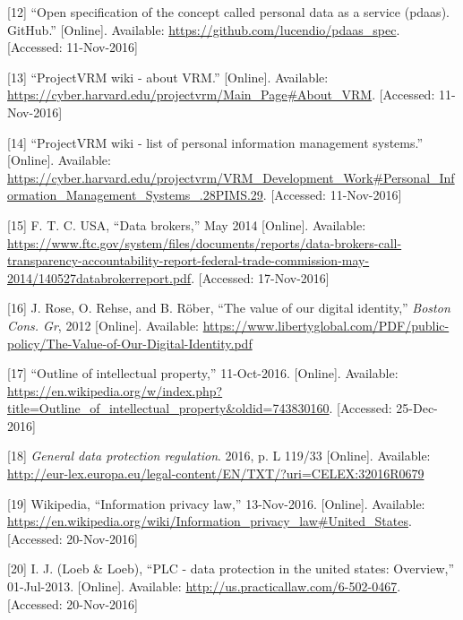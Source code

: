 \documentclass[12pt,english,a4paper,titlepage,cleardoublepage=empty,dottedtoc]{report}
\begin{document}
\hypertarget{ref-repo_2016_pdaas-spec}{}
{[}12{]} ``Open specification of the concept called personal data as a
service (pdaas). GitHub.'' {[}Online{]}. Available:
\url{https://github.com/lucendio/pdaas_spec}. {[}Accessed:
11-Nov-2016{]}

\hypertarget{ref-web_2010_projectvrm-wiki_about-vrm}{}
{[}13{]} ``ProjectVRM wiki - about VRM.'' {[}Online{]}. Available:
\url{https://cyber.harvard.edu/projectvrm/Main_Page\#About_VRM}.
{[}Accessed: 11-Nov-2016{]}

\hypertarget{ref-web_2010_projectvrm-wiki_pims-example-list}{}
{[}14{]} ``ProjectVRM wiki - list of personal information management
systems.'' {[}Online{]}. Available:
\url{https://cyber.harvard.edu/projectvrm/VRM_Development_Work\#Personal_Information_Management_Systems_.28PIMS.29}.
{[}Accessed: 11-Nov-2016{]}

\hypertarget{ref-report_2014_data-brokers}{}
{[}15{]} F. T. C. USA, ``Data brokers,'' May 2014 {[}Online{]}.
Available:
\url{https://www.ftc.gov/system/files/documents/reports/data-brokers-call-transparency-accountability-report-federal-trade-commission-may-2014/140527databrokerreport.pdf}.
{[}Accessed: 17-Nov-2016{]}

\hypertarget{ref-whitepaper_2012_the-value-of-our-digital-identity_definition}{}
{[}16{]} J. Rose, O. Rehse, and B. Röber, ``The value of our digital
identity,'' \emph{Boston Cons. Gr}, 2012 {[}Online{]}. Available:
\url{https://www.libertyglobal.com/PDF/public-policy/The-Value-of-Our-Digital-Identity.pdf}

\hypertarget{ref-web_2016_wikipedia_intellectual-property}{}
{[}17{]} ``Outline of intellectual property,'' 11-Oct-2016.
{[}Online{]}. Available:
\url{https://en.wikipedia.org/w/index.php?title=Outline_of_intellectual_property\&oldid=743830160}.
{[}Accessed: 25-Dec-2016{]}

\hypertarget{ref-regulation_2016_eu_general-data-protection-regulation_definition}{}
{[}18{]} \emph{General data protection regulation}. 2016, p. L 119/33
{[}Online{]}. Available:
\url{http://eur-lex.europa.eu/legal-content/EN/TXT/?uri=CELEX:32016R0679}

\hypertarget{ref-web_2016_wikipedia_information-privacy-law_us}{}
{[}19{]} Wikipedia, ``Information privacy law,'' 13-Nov-2016.
{[}Online{]}. Available:
\url{https://en.wikipedia.org/wiki/Information_privacy_law\#United_States}.
{[}Accessed: 20-Nov-2016{]}

\hypertarget{ref-web_2016_data-protection-laws-in-the-us}{}
{[}20{]} I. J. (Loeb \& Loeb), ``PLC - data protection in the united
states: Overview,'' 01-Jul-2013. {[}Online{]}. Available:
\url{http://us.practicallaw.com/6-502-0467}. {[}Accessed: 20-Nov-2016{]}
\end{document}
